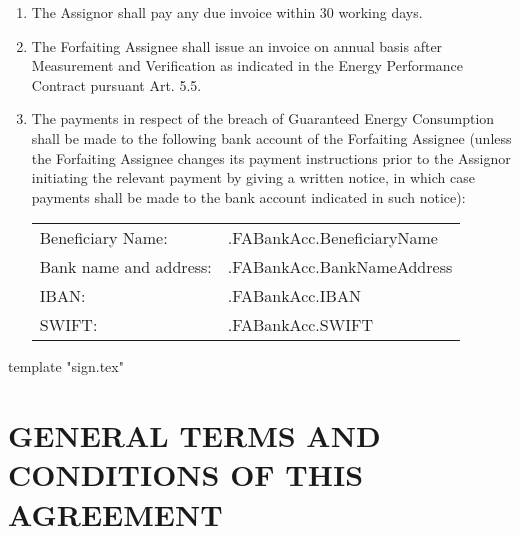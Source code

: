 \documentclass[a4paper]{article}
\begin{document}
\begin{enumerate}
\item{The Assignor shall pay any due invoice within 30 working days.}

\item{The Forfaiting Assignee shall issue an invoice on annual basis
    after Measurement and Verification as indicated in the Energy
    Performance Contract pursuant Art. 5.5.}

\item{The payments in respect of the breach of Guaranteed Energy
    Consumption shall be made to the following bank account of the
    Forfaiting Assignee (unless the Forfaiting Assignee changes its
    payment instructions prior to the Assignor initiating the relevant
    payment by giving a written notice, in which case payments shall
    be made to the bank account indicated in such notice):

    \begin{tabu}{XX[2]}
      Beneficiary Name: 	& 	{{.FABankAcc.BeneficiaryName}} 	\\
      Bank name and address: 	& 	{{.FABankAcc.BankNameAddress}} 	\\
      IBAN:			& 	{{.FABankAcc.IBAN}} 		\\
      SWIFT:			& 	{{.FABankAcc.SWIFT}} 		\\
    \end{tabu}}

\end{enumerate}

{{template "sign.tex"}}

\section{GENERAL TERMS AND CONDITIONS OF THIS AGREEMENT}
\end{document}
